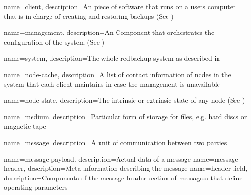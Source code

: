 {
    name={client},
    description={An piece of software that runs on a users computer that is in charge of creating and restoring backups (See )}
}

{
    name={management},
    description={An Component that orchestrates the configuration of the system (See )}
}

{
    name={system},
    description={The whole redbackup system as described in }
}

{
    name={node-cache},
    description={A list of contact information of nodes in the system that each client maintains in case the management is unavailable}
}

{
    name={node state},
    description={The intrinsic or extrinsic state of any node (See )}
}

{
    name={medium},
    description={Particular form of storage for files, e.g. hard discs or magnetic tape}
}

{
    name={message},
    description={A unit of communication between two parties}
}

{
    name={message payload},
    description={Actual data of a message}
}
{
    name={message header},
    description={Meta information describing the message}
}
{
    name={header field},
    description={Components of the \gls{message-header} section of \glspl{messages} that define operating parameters}
}


